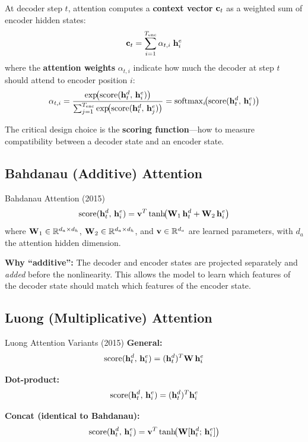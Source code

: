 At decoder step $t$, attention computes a \textbf{context vector}
$\mathbf{c}_t$ as a weighted sum of encoder hidden states:
\begin{equation}
\mathbf{c}_t = \sum_{i=1}^{T_{\text{enc}}} \alpha_{t,i} \;\mathbf{h}_i^e
\label{eq:context_vec}
\end{equation}
where the \textbf{attention weights} $\alpha_{t,i}$ indicate how much the
decoder at step $t$ should attend to encoder position $i$:
\begin{equation}
\alpha_{t,i}
= \frac{\exp\!\bigl(\text{score}(\mathbf{h}_t^d,\, \mathbf{h}_i^e)\bigr)}
       {\sum_{j=1}^{T_{\text{enc}}}
        \exp\!\bigl(\text{score}(\mathbf{h}_t^d,\, \mathbf{h}_j^e)\bigr)}
= \operatorname{softmax}_i\!\bigl(\text{score}(\mathbf{h}_t^d,\, \mathbf{h}_i^e)\bigr)
\label{eq:attn_weights}
\end{equation}

The critical design choice is the \textbf{scoring function}---how to
measure compatibility between a decoder state and an encoder state.

\subsection{Bahdanau (Additive) Attention}

\begin{mathresult}{Bahdanau Attention (2015)}
\begin{equation}
\text{score}(\mathbf{h}_t^d,\, \mathbf{h}_i^e)
= \mathbf{v}^T \tanh\!\bigl(\mathbf{W}_1 \,\mathbf{h}_t^d + \mathbf{W}_2 \,\mathbf{h}_i^e\bigr)
\label{eq:bahdanau}
\end{equation}
where $\mathbf{W}_1 \in \mathbb{R}^{d_a \times d_h}$, $\mathbf{W}_2 \in \mathbb{R}^{d_a \times d_h}$,
and $\mathbf{v} \in \mathbb{R}^{d_a}$ are learned parameters, with $d_a$ the
attention hidden dimension.
\end{mathresult}

\textbf{Why ``additive'':}  The decoder and encoder states are projected
separately and \emph{added} before the nonlinearity.  This allows the
model to learn which features of the decoder state should match which
features of the encoder state.

\subsection{Luong (Multiplicative) Attention}

\begin{mathresult}{Luong Attention Variants (2015)}
\textbf{General:}
\begin{equation}
\text{score}(\mathbf{h}_t^d,\, \mathbf{h}_i^e)
= (\mathbf{h}_t^d)^T \mathbf{W} \,\mathbf{h}_i^e
\label{eq:luong_general}
\end{equation}

\textbf{Dot-product:}
\begin{equation}
\text{score}(\mathbf{h}_t^d,\, \mathbf{h}_i^e)
= (\mathbf{h}_t^d)^T \mathbf{h}_i^e
\label{eq:luong_dot}
\end{equation}

\textbf{Concat (identical to Bahdanau):}
\begin{equation}
\text{score}(\mathbf{h}_t^d,\, \mathbf{h}_i^e)
= \mathbf{v}^T \tanh\!\bigl(\mathbf{W} [\mathbf{h}_t^d ;\, \mathbf{h}_i^e]\bigr)
\label{eq:luong_concat}
\end{equation}
\end{mathresult}

